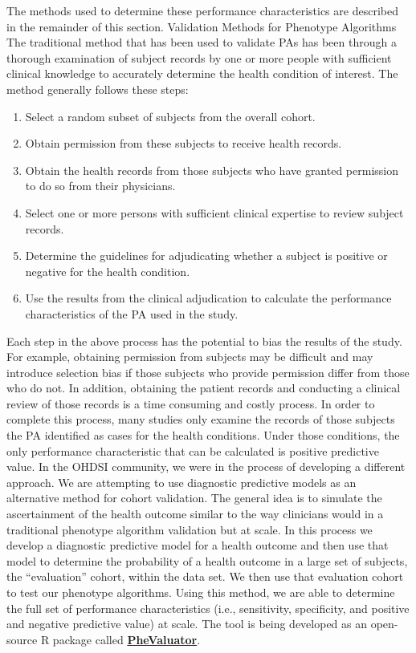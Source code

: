 \documentclass[11pt]{book}
\theoremstyle{definition}
\theoremstyle{definition}
\theoremstyle{definition}
\theoremstyle{remark}
\begin{document}
The methods used to determine these performance characteristics are described in the remainder of this section.
Validation Methods for Phenotype Algorithms
The traditional method that has been used to validate PAs has been through a thorough examination of subject records by one or more people with sufficient clinical knowledge to accurately determine the health condition of interest. The method generally follows these steps:

\begin{enumerate}
\def\labelenumi{\arabic{enumi})}
\item
  Select a random subset of subjects from the overall cohort.
\item
  Obtain permission from these subjects to receive health records.
\item
  Obtain the health records from those subjects who have granted permission to do so from their physicians.
\item
  Select one or more persons with sufficient clinical expertise to review subject records.
\item
  Determine the guidelines for adjudicating whether a subject is positive or negative for the health condition.
\item
  Use the results from the clinical adjudication to calculate the performance characteristics of the PA used in the study.
\end{enumerate}

Each step in the above process has the potential to bias the results of the study. For example, obtaining permission from subjects may be difficult and may introduce selection bias if those subjects who provide permission differ from those who do not. In addition, obtaining the patient records and conducting a clinical review of those records is a time consuming and costly process. In order to complete this process, many studies only examine the records of those subjects the PA identified as cases for the health conditions. Under those conditions, the only performance characteristic that can be calculated is positive predictive value.
In the OHDSI community, we were in the process of developing a different approach. We are attempting to use diagnostic predictive models as an alternative method for cohort validation. The general idea is to simulate the ascertainment of the health outcome similar to the way clinicians would in a traditional phenotype algorithm validation but at scale. In this process we develop a diagnostic predictive model for a health outcome and then use that model to determine the probability of a health outcome in a large set of subjects, the ``evaluation'' cohort, within the data set. We then use that evaluation cohort to test our phenotype algorithms. Using this method, we are able to determine the full set of performance characteristics (i.e., sensitivity, specificity, and positive and negative predictive value) at scale. The tool is being developed as an open-source R package called \href{https://github.com/OHDSI/PheValuator}{\textbf{PheValuator}}.
\end{document}
